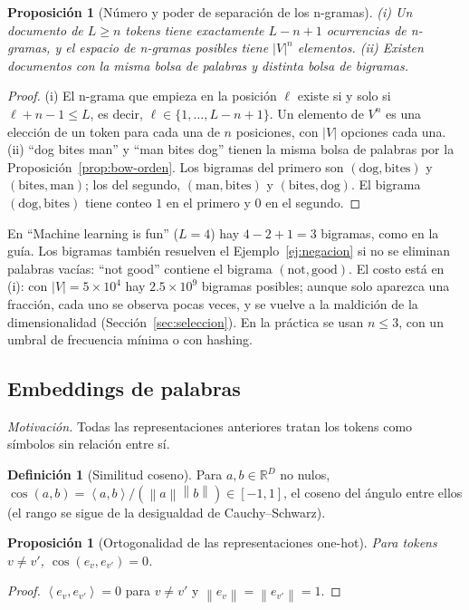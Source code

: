 \documentclass[11pt]{article}
\newtheorem{proposicion}[teorema]{Proposición}
\theoremstyle{definition}
\newtheorem{definicion}[teorema]{Definición}
\theoremstyle{remark}
\newcommand{\R}{\mathbb{R}}
\newcommand{\norm}[1]{\left\lVert #1\right\rVert}
\newcommand{\abs}[1]{\left\lvert #1\right\rvert}
\newcommand{\ip}[2]{\left\langle #1,#2\right\rangle}
\begin{document}
\begin{proposicion}[Número y poder de separación de los n-gramas]\label{prop:ngramas}
\noindent (i) Un documento de $L\ge n$ tokens tiene exactamente $L-n+1$ ocurrencias de n-gramas, y el espacio de n-gramas posibles tiene $\abs V^n$ elementos. (ii) Existen documentos con la misma bolsa de palabras y distinta bolsa de bigramas.
\end{proposicion}
\begin{proof}
\noindent (i) El n-grama que empieza en la posición $\ell$ existe si y solo si $\ell+n-1\le L$, es decir, $\ell\in\{1,\dots,L-n+1\}$. Un elemento de $V^n$ es una elección de un token para cada una de $n$ posiciones, con $\abs V$ opciones cada una. (ii) ``dog bites man'' y ``man bites dog'' tienen la misma bolsa de palabras por la Proposición~\ref{prop:bow-orden}. Los bigramas del primero son $(\text{dog},\text{bites})$ y $(\text{bites},\text{man})$; los del segundo, $(\text{man},\text{bites})$ y $(\text{bites},\text{dog})$. El bigrama $(\text{dog},\text{bites})$ tiene conteo $1$ en el primero y $0$ en el segundo.
\end{proof}

\noindent En ``Machine learning is fun'' ($L=4$) hay $4-2+1=3$ bigramas, como en la guía. Los bigramas también resuelven el Ejemplo~\ref{ej:negacion} si no se eliminan palabras vacías: ``not good'' contiene el bigrama $(\text{not},\text{good})$. El costo está en (i): con $\abs V=5\times10^4$ hay $2.5\times10^9$ bigramas posibles; aunque solo aparezca una fracción, cada uno se observa pocas veces, y se vuelve a la maldición de la dimensionalidad (Sección~\ref{sec:seleccion}). En la práctica se usan $n\le3$, con un umbral de frecuencia mínima o con hashing.

\subsection{Embeddings de palabras}\label{sec:embeddings}

\noindent \emph{Motivación.} Todas las representaciones anteriores tratan los tokens como símbolos sin relación entre sí.

\begin{definicion}[Similitud coseno]\label{def:coseno}
\noindent Para $a,b\in\R^D$ no nulos, $\cos(a,b)=\ip ab/(\norm a\norm b)\in[-1,1]$, el coseno del ángulo entre ellos (el rango se sigue de la desigualdad de Cauchy--Schwarz).
\end{definicion}

\begin{proposicion}[Ortogonalidad de las representaciones one-hot]\label{prop:ortogonal}
\noindent Para tokens $v\ne v'$, $\cos(e_v,e_{v'})=0$.
\end{proposicion}
\begin{proof}
\noindent $\ip{e_v}{e_{v'}}=0$ para $v\ne v'$ y $\norm{e_v}=\norm{e_{v'}}=1$.
\end{proof}
\end{document}
